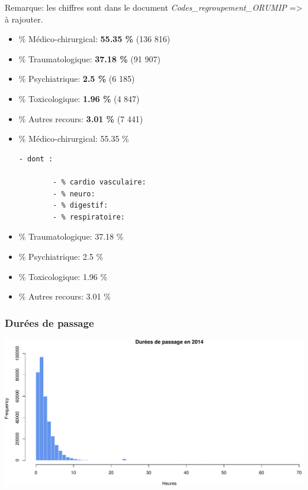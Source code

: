 \documentclass[]{article}
\begin{document}
Remarque: les chiffres sont dans le document
\emph{Codes\_regroupement\_ORUMIP} =\textgreater{} à rajouter.

\begin{itemize}
\item
  \% Médico-chirurgical: \textbf{55.35 \%} (136 816)
\item
  \% Traumatologique: \textbf{37.18 \%} (91 907)
\item
  \% Psychiatrique: \textbf{2.5 \%} (6 185)
\item
  \% Toxicologique: \textbf{1.96 \%} (4 847)
\item
  \% Autres recours: \textbf{3.01 \%} (7 441)
\item
  \% Médico-chirurgical: 55.35 \%

\begin{verbatim}
- dont :

        - % cardio vasculaire:
        - % neuro:
        - % digestif:
        - % respiratoire:
\end{verbatim}
\item
  \% Traumatologique: 37.18 \%
\item
  \% Psychiatrique: 2.5 \%
\item
  \% Toxicologique: 1.96 \%
\item
  \% Autres recours: 3.01 \%
\end{itemize}

\subsubsection{Durées de passage}\label{durees-de-passage}

\includegraphics{Figs/passages-1.pdf}
\end{document}
